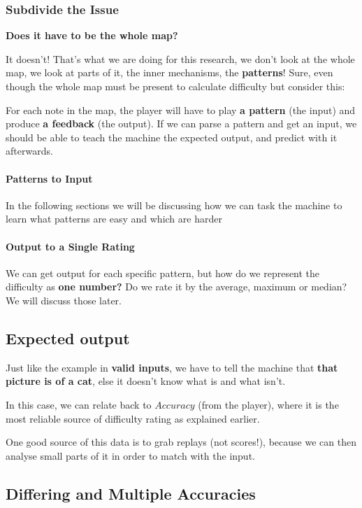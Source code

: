 \documentclass{article}
\begin{document}
\subsubsection{Subdivide the Issue}

\textbf{Does it have to be the whole map?}

It doesn't! That's what we are doing for this research, we don't look at the whole map, we look at parts of it, the inner mechanisms, the \textbf{patterns}! Sure, even though the whole map must be present to calculate difficulty but consider this:

For each note in the map, the player will have to play \textbf{a pattern} (the input) and produce \textbf{a feedback} (the output). If we can parse a pattern and get an input, we should be able to teach the machine the expected output, and predict with it afterwards.

\paragraph{Patterns to Input} In the following sections we will be discussing how we can task the machine to learn what patterns are easy and which are harder

\paragraph{Output to a Single Rating} We can get output for each specific pattern, but how do we represent the difficulty as \textbf{one number?} Do we rate it by the average, maximum or median? We will discuss those later.

\subsection{Expected output}

Just like the example in \textbf{valid inputs}, we have to tell the machine that \textbf{that picture is of a cat}, else it doesn't know what is and what isn't.

In this case, we can relate back to $Accuracy$ (from the player), where it is the most reliable source of difficulty rating as explained earlier.

One good source of this data is to grab replays (not scores!), because we can then analyse small parts of it in order to match with the input. 

\subsection{Differing and Multiple Accuracies}
\end{document}

